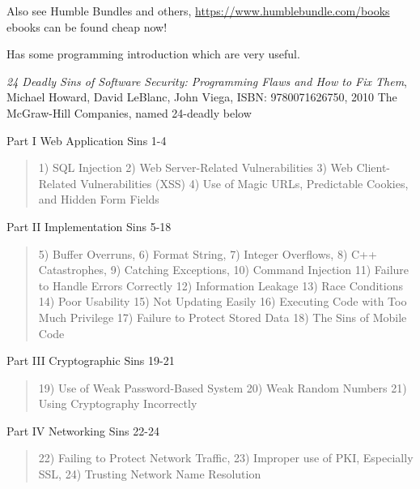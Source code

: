 \documentclass[Screen16to9,17pt]{foils}
\begin{document}
Also see Humble Bundles and others, \url{https://www.humblebundle.com/books} ebooks can be found cheap now!

Has some programming introduction which are very useful.


\emph{24 Deadly Sins of Software Security: Programming Flaws and How to Fix Them}, Michael Howard, David LeBlanc, John Viega, ISBN: 9780071626750, 2010 The McGraw-Hill Companies, named 24-deadly below


\begin{list1}
\item Part I Web Application Sins 1-4
\begin{quote}
1) SQL Injection
2) Web Server-Related Vulnerabilities
3) Web Client-Related Vulnerabilities (XSS)
4) Use of Magic URLs, Predictable Cookies, and Hidden Form Fields
\end{quote}
\item Part II Implementation Sins 5-18
\begin{quote}
5) Buffer Overruns, 6) Format String, 7) Integer Overflows,
8) C++ Catastrophes, 9) Catching Exceptions, 10) Command Injection
11) Failure to Handle Errors Correctly 12) Information Leakage
13) Race Conditions 14) Poor Usability
15) Not Updating Easily
16) Executing Code with Too Much Privilege
17) Failure to Protect Stored Data
18) The Sins of Mobile Code
\end{quote}
\end{list1}




\begin{list1}
\item Part III Cryptographic Sins 19-21
\begin{quote}
19) Use of Weak Password-Based System
20) Weak Random Numbers
21) Using Cryptography Incorrectly
\end{quote}
\item Part IV Networking Sins 22-24
\begin{quote}
22) Failing to Protect Network Traffic,
23) Improper use of PKI, Especially SSL,
24) Trusting Network Name Resolution
\end{quote}
\end{list1}



\end{document}
